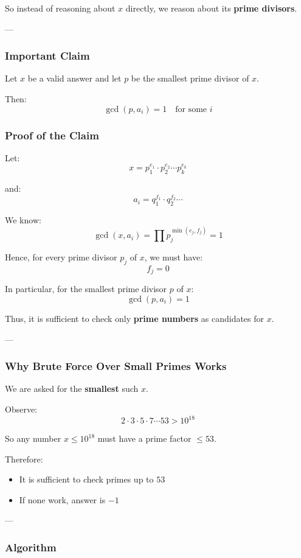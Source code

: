 \documentclass[11pt]{article}
\begin{document}
So instead of reasoning about $x$ directly, we reason about its \textbf{prime divisors}.

---

\subsubsection{Important Claim}

Let $x$ be a valid answer and let $p$ be the smallest prime divisor of $x$.

Then:
\[
\gcd(p, a_i) = 1 \quad \text{for some } i
\]

\subsubsection{Proof of the Claim}

Let:
\[
x = p_1^{e_1} \cdot p_2^{e_2} \cdots p_k^{e_k}
\]

and:
\[
a_i = q_1^{f_1} \cdot q_2^{f_2} \cdots
\]

We know:
\[
\gcd(x, a_i) = \prod p_j^{\min(e_j, f_j)} = 1
\]

Hence, for every prime divisor $p_j$ of $x$, we must have:
\[
f_j = 0
\]

In particular, for the smallest prime divisor $p$ of $x$:
\[
\gcd(p, a_i) = 1
\]

Thus, it is sufficient to check only \textbf{prime numbers} as candidates for $x$.

---

\subsubsection{Why Brute Force Over Small Primes Works}

We are asked for the \textbf{smallest} such $x$.

Observe:
\[
2 \cdot 3 \cdot 5 \cdot 7 \cdots 53 > 10^{18}
\]

So any number $x \le 10^{18}$ must have a prime factor $\le 53$.

Therefore:
\begin{itemize}
    \item It is sufficient to check primes up to $53$
    \item If none work, answer is $-1$
\end{itemize}

---

\subsubsection{Algorithm}
\end{document}
